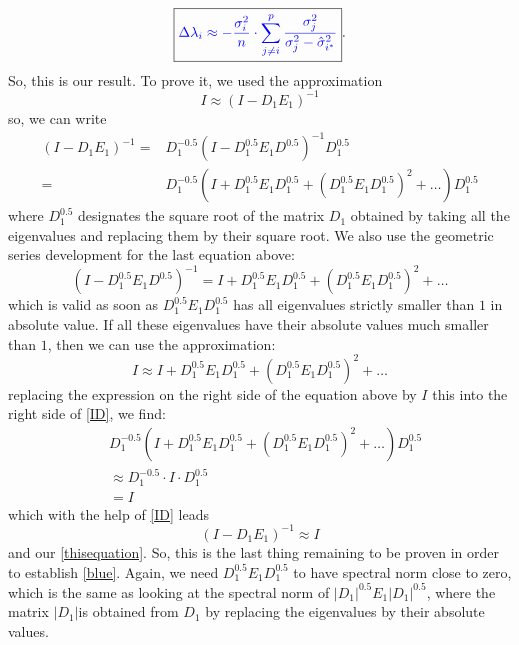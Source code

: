 \documentclass[12pt]{amsart}
\theoremstyle{definition}
\numberwithin{equation}{section}
\numberwithin{equation}{section}
\theoremstyle{remark}
\numberwithin{equation}{section}
\begin{document}
\begin{equation}
\label{blue}
\boxed{{\color{blue}\Delta\lambda_i\approx
		-\frac{\sigma_i^2}{n}\cdot \sum_{j\neq i}^p
		\frac{\sigma^2_j}{\sigma_j^2-\hat{\sigma}_{i^*}^2}  }}.
\end{equation}
So, this is our result. To prove it, we used the approximation
\begin{equation}\label{thisequation}I\approx(I-D_1E_1)^{-1}\end{equation}
so, we can write
\begin{align}
\label{ID}
(I-D_1E_1)^{-1} =& D_1^{-0.5}\left(I-D_1^{0.5}E_1D^{0.5}\right)^{-1}D_1^{0.5}\nonumber\\
=& D_1^{-0.5}(I+D_1^{0.5}E_1D_1^{0.5}+(D_1^{0.5}E_1D_1^{0.5})^2+\ldots)D_1^{0.5}
\end{align}
where $D_1^{0.5}$ designates the square root of the matrix $D_1$ obtained
by taking all the eigenvalues and replacing them by their square root.
We also use the geometric series development for the last equation above:
$$(I-D_1^{0.5}E_1D^{0.5})^{-1}=I+D_1^{0.5}E_1D_1^{0.5}+(D_1^{0.5}E_1D_1^{0.5})^2+\ldots$$
which is valid as soon as $D_1^{0.5}E_1D_1^{0.5}$ has all eigenvalues strictly smaller than
$1$ in absolute value. If all these eigenvalues have their absolute values much smaller than
$1$, then we can use the approximation:
$$I\approx I+D_1^{0.5}E_1D_1^{0.5}+(D_1^{0.5}E_1D_1^{0.5})^2+\ldots$$
replacing the expression on the right side of the equation above by $I$ this into the right side of \ref{ID}, we find:
\begin{align*}
&D_1^{-0.5}(I+D_1^{0.5}E_1D_1^{0.5}+(D_1^{0.5}E_1D_1^{0.5})^2+\ldots)D_1^{0.5}\\
&\approx D_1^{-0.5}\cdot I\cdot D_1^{0.5}\\
&=I
\end{align*}
which with the help of \ref{ID} leads
$$(I-D_1E_1)^{-1}\approx I$$
and our \ref{thisequation}. So, this is the last thing remaining to be proven in order to establish \ref{blue}.
Again, we need $D_1^{0.5}E_1D_1^{0.5}$ to have spectral norm close to zero, which is the same
as looking at the spectral norm of $|D_1|^{0.5}E_1|D_1|^{0.5}$,
where the matrix $|D_1|$is obtained from $D_1$ by replacing the eigenvalues by their absolute values.
\end{document}
